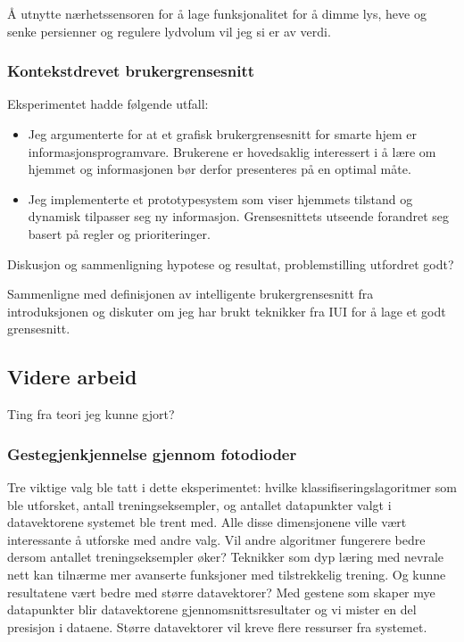 Å utnytte nærhetssensoren for å lage funksjonalitet for å dimme lys, heve og senke persienner og regulere lydvolum vil jeg si er av verdi.

\subsubsection*{Kontekstdrevet brukergrensesnitt}
Eksperimentet hadde følgende utfall:
\begin{itemize}
\item Jeg argumenterte for at et grafisk brukergrensesnitt for smarte hjem er informasjonsprogramvare. Brukerene er hovedsaklig interessert i å lære om hjemmet og informasjonen bør derfor presenteres på en optimal måte.
\item Jeg implementerte et prototypesystem som viser hjemmets tilstand og dynamisk tilpasser seg ny informasjon. Grensesnittets utseende forandret seg basert på regler og prioriteringer.
\end{itemize}

{\color{blue}Diskusjon og sammenligning hypotese og resultat, problemstilling utfordret godt?

Sammenligne med definisjonen av intelligente brukergrensesnitt fra introduksjonen og diskuter om jeg har brukt teknikker fra IUI for å lage et godt grensesnitt.}

\subsection{Videre arbeid}
\label{ch:videre}
{\color{blue}Ting fra teori jeg kunne gjort?}

\subsubsection*{Gestegjenkjennelse gjennom fotodioder}
Tre viktige valg ble tatt i dette eksperimentet: hvilke klassifiseringslagoritmer som ble utforsket, antall treningseksempler, og antallet datapunkter valgt i datavektorene systemet ble trent med. Alle disse dimensjonene ville vært interessante å utforske med andre valg. Vil andre algoritmer fungerere bedre dersom antallet treningseksempler øker? Teknikker som dyp læring med nevrale nett kan tilnærme mer avanserte funksjoner med tilstrekkelig trening. Og kunne resultatene vært bedre med større datavektorer? Med gestene som skaper mye datapunkter blir datavektorene gjennomsnittsresultater og vi mister en del presisjon i dataene. Større datavektorer vil kreve flere ressurser fra systemet.

